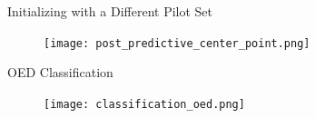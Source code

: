 \documentclass[usenames,dvipsnames,aspectratio=169]{beamer}
\theoremstyle{definition}
\begin{document}
\begin{frame}{Initializing with a Different Pilot Set}
\begin{figure}[H]
    \texttt{[image: post\_predictive\_center\_point.png]}
\end{figure}
\end{frame}

\begin{frame}{OED Classification}

    \begin{figure}[H]
        \texttt{[image: classification\_oed.png]}
    \end{figure}

\end{frame}

\end{document}
